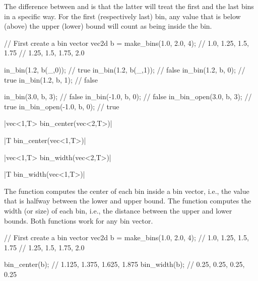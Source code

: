 The difference between  and  is that the latter will treat the first and the last bins in a specific way. For the first (respectively last) bin, any value that is below (above) the upper (lower) bound will count as being inside the bin.

\begin{example}
\begin{cppcode}
// First create a bin vector
vec2d b = make_bins(1.0, 2.0, 4);
// {1.0,  1.25, 1.5,  1.75}
// {1.25, 1.5,  1.75, 2.0}

in_bin(1.2, b(_,0)); // true
in_bin(1.2, b(_,1)); // false
in_bin(1.2, b, 0);   // true
in_bin(1.2, b, 1);   // false

in_bin(3.0,  b, 3);      // false
in_bin(-1.0, b, 0);      // false
in_bin_open(3.0,  b, 3); // true
in_bin_open(-1.0, b, 0); // true
\end{cppcode}
\end{example}

\funcitem \cppinline|vec<1,T> bin_center(vec<2,T>)| 

\cppinline|T bin_center(vec<1,T>)|

\cppinline|vec<1,T> bin_width(vec<2,T>)| 

\cppinline|T bin_width(vec<1,T>)|

The function  computes the center of each bin inside a bin vector, i.e., the value that is halfway between the lower and upper bound. The function  computes the width (or size) of each bin, i.e., the distance between the upper and lower bounds. Both functions work for any bin vector.

\begin{example}
\begin{cppcode}
// First create a bin vector
vec2d b = make_bins(1.0, 2.0, 4);
// {1.0,  1.25, 1.5,  1.75}
// {1.25, 1.5,  1.75, 2.0}

bin_center(b); // {1.125, 1.375, 1.625, 1.875}
bin_width(b); // {0.25, 0.25, 0.25, 0.25}
\end{cppcode}
\end{example}

